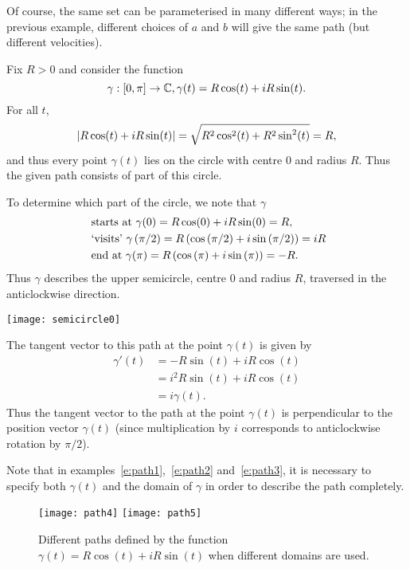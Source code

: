 Of course, the same set can be parameterised in many different ways; in the previous example, different choices of $a$ and $b$ will give the same path (but different velocities).
\begin{example}
\label{e:path3}
Fix $R>0$ and consider the function
\[
\gamma:[0,\pi] \to \mathbb{C}, \gamma (t) = R \cos (t) + i R \sin (t).
\]
For all $t$, 
\[ \left| R \cos(t)+iR \sin (t) \right| = \sqrt{R^2\cos^2(t)+R^2\sin^2 (t)} = R,
\]
and thus every point $\gamma(t)$ lies on the circle with centre $0$ and radius $R$.  Thus the given path consists of part of this circle.

To determine which part of the circle, we note that $\gamma$
\begin{align*}
& \text{ starts at } \gamma (0) = R\cos(0)+iR\sin(0)=R,\\
& \text{ `visits' }  \gamma \left( \pi /2 \right) = R \left( \cos \left( \pi / 2 \right) + i \sin \left( \pi / 2 \right) \right) = iR \\
& \text{ end at }  \gamma (\pi) = R \left( \cos \left( \pi \right) + i \sin \left( \pi \right) \right) = -R.
\end{align*}
Thus $\gamma$ describes the upper semicircle, centre $0$ and radius $R$, traversed in the anticlockwise direction.
\begin{center}
\texttt{[image: semicircle0]}
\end{center}
The tangent vector to this path at the point $\gamma (t)$ is given by
\begin{align*}
\gamma '(t)& = -R \sin (t) + i R \cos (t) \\
& = i^2 R \sin (t)+iR \cos (t) \\
& = i \gamma (t).
\end{align*}
Thus the tangent vector to the path at the point $\gamma (t)$ is perpendicular to the position vector $\gamma(t)$ (since multiplication by $i$ corresponds to anticlockwise rotation by $\pi/2$).
\end{example}
Note that in examples~\ref{e:path1},~\ref{e:path2} and~\ref{e:path3}, it is necessary to specify both $\gamma(t)$ and the domain of $\gamma$ in order to describe the path completely.

\begin{figure}[h]
\centering
\texttt{[image: path4]}
\texttt{[image: path5]}
\caption{Different paths defined by the function $\gamma(t) = R \cos (t) + i R \sin (t)$ when different domains are used.}
\end{figure}

